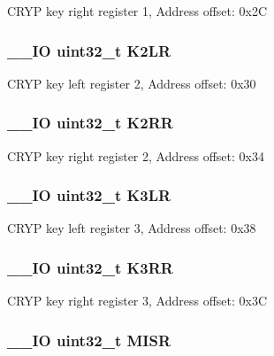C\-R\-Y\-P key right register 1, Address offset\-: 0x2\-C \hypertarget{struct_c_r_y_p___type_def_a32210fb9ecbb0b4bd127e688f3f79802}{
\subsubsection[{K2\-L\-R}]{\setlength{\rightskip}{0pt plus 5cm}\-\_\-\-\_\-\-I\-O uint32\-\_\-t K2\-L\-R}}\label{struct_c_r_y_p___type_def_a32210fb9ecbb0b4bd127e688f3f79802}
C\-R\-Y\-P key left register 2, Address offset\-: 0x30 \hypertarget{struct_c_r_y_p___type_def_a41a0448734e8ccbdd6fba98284815c6f}{
\subsubsection[{K2\-R\-R}]{\setlength{\rightskip}{0pt plus 5cm}\-\_\-\-\_\-\-I\-O uint32\-\_\-t K2\-R\-R}}\label{struct_c_r_y_p___type_def_a41a0448734e8ccbdd6fba98284815c6f}
C\-R\-Y\-P key right register 2, Address offset\-: 0x34 \hypertarget{struct_c_r_y_p___type_def_a516c328fcb53ec754384e584caf890f5}{
\subsubsection[{K3\-L\-R}]{\setlength{\rightskip}{0pt plus 5cm}\-\_\-\-\_\-\-I\-O uint32\-\_\-t K3\-L\-R}}\label{struct_c_r_y_p___type_def_a516c328fcb53ec754384e584caf890f5}
C\-R\-Y\-P key left register 3, Address offset\-: 0x38 \hypertarget{struct_c_r_y_p___type_def_a8fe249258f1733ec155c3893375c7a21}{
\subsubsection[{K3\-R\-R}]{\setlength{\rightskip}{0pt plus 5cm}\-\_\-\-\_\-\-I\-O uint32\-\_\-t K3\-R\-R}}\label{struct_c_r_y_p___type_def_a8fe249258f1733ec155c3893375c7a21}
C\-R\-Y\-P key right register 3, Address offset\-: 0x3\-C \hypertarget{struct_c_r_y_p___type_def_a524e134cec519206cb41d0545e382978}{
\subsubsection[{M\-I\-S\-R}]{\setlength{\rightskip}{0pt plus 5cm}\-\_\-\-\_\-\-I\-O uint32\-\_\-t M\-I\-S\-R}}\label{struct_c_r_y_p___type_def_a524e134cec519206cb41d0545e382978}
